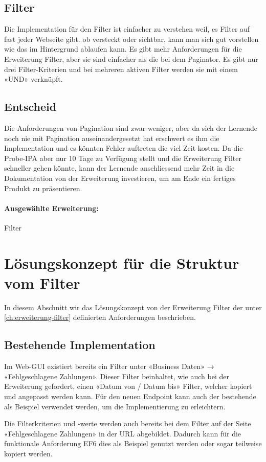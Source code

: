 \subsection{Filter}
Die Implementation für den Filter ist einfacher zu verstehen weil, es Filter auf fast jeder Webseite gibt. ob versteckt oder sichtbar, kann man sich gut vorstellen wie das im Hintergrund ablaufen kann. Es gibt mehr Anforderungen für die Erweiterung Filter, aber sie sind einfacher als die bei dem Paginator. Es gibt nur drei Filter-Kriterien und bei mehreren aktiven Filter werden sie mit einem «UND» verknüpft.

\subsection{Entscheid}
Die Anforderungen von Pagination sind zwar weniger, aber da sich der Lernende noch nie mit Pagination auseinandergesetzt hat erschwert es ihm die Implementation und es könnten Fehler auftreten die viel Zeit kosten. Da die Probe-IPA aber nur 10 Tage zu Verfügung stellt und die Erweiterung Filter schneller gehen könnte, kann der Lernende anschliessend mehr Zeit in die Dokumentation von der Erweiterung investieren, um am Ende ein fertiges Produkt zu präsentieren.
\paragraph{Ausgewählte Erweiterung:} Filter

\section{Lösungskonzept für die Struktur vom Filter}
In diesem Abschnitt wir das Lösungskonzept von der Erweiterung Filter der unter \ref{ch:erweiterung-filter} definierten Anforderungen beschrieben.

\subsection{Bestehende Implementation}
Im Web-GUI existiert bereits ein Filter unter «Business Daten» → «Fehlgeschlagene Zahlungen». Dieser Filter beinhaltet, wie auch bei der Erweiterung gefordert, einen «Datum von / Datum bis» Filter, welcher kopiert und angepasst werden kann. Für den neuen Endpoint kann auch der bestehende als Beispiel verwendet werden, um die Implementierung zu erleichtern.

Die Filterkriterien und -werte werden auch bereits bei dem Filter auf der Seite «Fehlgeschlagene Zahlungen» in der URL abgebildet. Dadurch kann für die funktionale Anforderung EF6 dies als Beispiel genutzt werden oder sogar teilweise kopiert werden.


